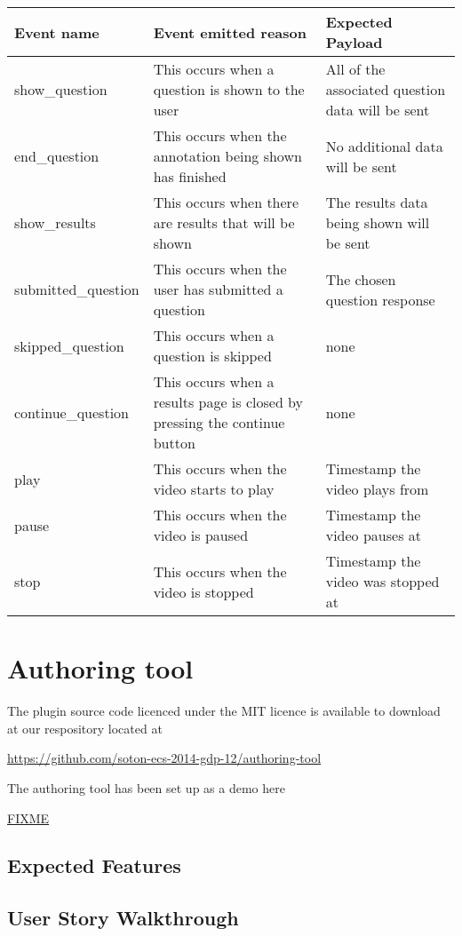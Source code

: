 \documentclass[12pt,a4paper]{article}
\begin{document}
\begin{tabular}{p{3.2cm} p{7cm} p{4cm}}

\textbf{Event name} & \textbf{Event emitted reason} & \textbf{Expected Payload} \\ 
\hline 
show\_question & This occurs when a question is shown to the user & All of the associated question data will be sent \\ 
\hline 
end\_question & This occurs when the annotation being shown has finished & No additional data will be sent \\ 
\hline 
show\_results & This occurs when there are results that will be shown & The results data being shown will be sent \\ 
\hline 
submitted\_question & This occurs when the user has submitted a question & The chosen question response \\ 
\hline 
skipped\_question & This occurs when a question is skipped & none \\ 
\hline 
continue\_question & This occurs when a results page is closed by pressing the continue button & none \\ 
\hline 
play & This occurs when the video starts to play & Timestamp the video plays from \\ 
\hline 
pause & This occurs when the video is paused & Timestamp the video pauses at \\ 
\hline 
stop & This occurs when the video is stopped & Timestamp the video was stopped at \\
\end{tabular} 


\section*{Authoring tool}

The plugin source code licenced under the MIT licence is available to download at our respository located at 

\url{https://github.com/soton-ecs-2014-gdp-12/authoring-tool}

The authoring tool has been set up as a demo here

\url{FIXME}

\subsection*{Expected Features}



\subsection*{User Story Walkthrough}
\end{document}

